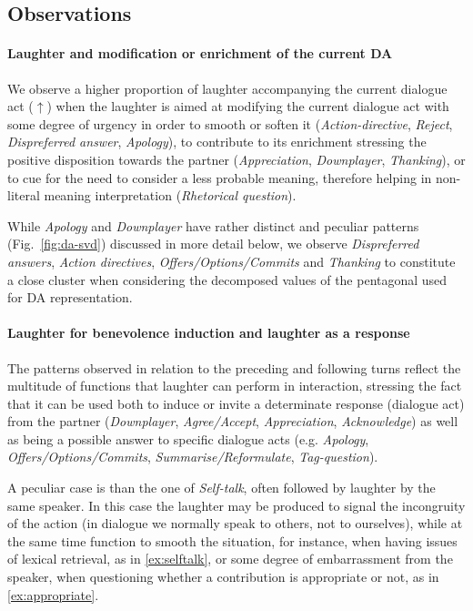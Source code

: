 \documentclass[11pt,a4paper]{article}
\begin{document}
\subsection{Observations}
\label{sec:observations}
\paragraph{Laughter and modification or enrichment of the current DA}
We observe a higher proportion of laughter accompanying the current
dialogue act ($\uparrow$) when the laughter is aimed at modifying
the current dialogue act with some degree of urgency in order to
smooth or soften it (\emph{Action-directive}, \emph{Reject},
\emph{Dispreferred answer}, \emph{Apology}), to contribute to its
enrichment stressing the positive disposition towards the partner
(\emph{Appreciation}, \emph{Downplayer}, \emph{Thanking}), or to cue
for the need to consider a less probable meaning, therefore helping
in non-literal meaning interpretation (\emph{Rhetorical question}).
 
While \emph{Apology} and \emph{Downplayer} have rather distinct and peculiar
patterns (Fig.~\ref{fig:da-svd}) discussed in more detail below, we
observe \emph{Dispreferred answers}, \emph{Action directives},
\emph{Offers/Options/Commits} and \emph{Thanking} to constitute a
close cluster when considering the decomposed values of the pentagonal
used for DA representation.%
 
\paragraph{Laughter for benevolence induction and laughter as a response}
The patterns observed in relation to the preceding and following
turns reflect the multitude of functions that
laughter can perform in interaction, stressing the fact that it can be
used both to induce or invite a determinate response (dialogue act) from
the partner (\emph{Downplayer}, \emph{Agree/Accept}, \emph{Appreciation}, \emph{Acknowledge})
as well as being a possible answer to specific dialogue acts
(e.g. \emph{Apology}, \emph{Offers/Options/Commits}, \emph{Summarise/Reformulate},
\emph{Tag-question}).

A peculiar case is than the one of \emph{Self-talk}, often followed by
laughter by the same speaker. In this case the laughter may be
produced to signal the incongruity of the action (in dialogue we
normally speak to others, not to ourselves), while at the same time
function to smooth the situation, for instance, when having issues of
lexical retrieval, as in \ref{ex:selftalk}, or some degree of
embarrassment from the speaker, when questioning whether a
contribution is appropriate or not, as in
\ref{ex:appropriate}.
\end{document}
